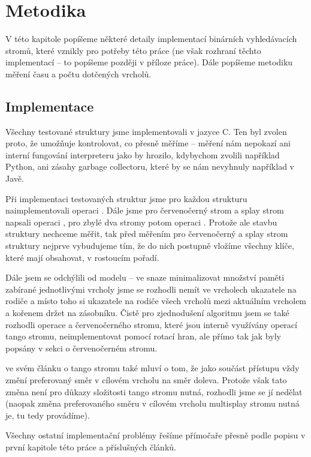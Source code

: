 \chapter{Metodika}

V této kapitole popíšeme některé detaily implementací binárních vyhledávacích stromů, které vznikly pro potřeby této práce (ne však rozhraní těchto implementací -- to popíšeme později v příloze práce). Dále popíšeme metodiku měření času a počtu dotčených vrcholů.

\section{Implementace}

Všechny testované struktury jsme implementovali v jazyce C. Ten byl zvolen proto, že umožňuje kontrolovat, co přesně měříme -- měření nám nepokazí ani interní fungování interpreteru jako by hrozilo, kdybychom zvolili například Python, ani zásahy garbage collectoru, které by se nám nevyhnuly například v Javě.

Při implementaci testovaných struktur jsme pro každou strukturu naimplementovali operaci . Dále jsme pro červenočerný strom a splay strom napsali operaci , pro zbylé dva stromy potom operaci . Protože ale stavbu struktury nechceme měřit, tak před měřením pro červenočerný a splay strom struktury nejprve vybudujeme tím, že do nich postupně vložíme všechny klíče, které mají obsahovat, v rostoucím pořadí. 

Dále jsem se odchýlili od modelu -- ve snaze minimalizovat množství paměti zabírané jednotlivými vrcholy jsme se rozhodli nemít ve vrcholech ukazatele na rodiče a místo toho si ukazatele na rodiče všech vrcholů mezi aktuálním vrcholem a kořenem držet na zásobníku. Čistě pro zjednodušení algoritmu jsem se také rozhodli operace  a  červenočerného stromu, které jsou interně využívány operací  tango stromu, neimplementovat pomocí rotací hran, ale přímo tak jak byly popsány v sekci o červenočerném stromu. 

\citet{tango} ve svém článku o tango stromu také mluví o tom, že jako součást přístupu vždy změní preferovaný směr v cílovém vrcholu na směr doleva. Protože však tato změna není pro důkazy složitosti tango stromu nutná, rozhodli jsme se jí nedělat (naopak změna preferovaného směru v cílovém vrcholu multisplay stromu nutná je, tu tedy provádíme).

Všechny ostatní implementační problémy řešíme přímočaře přesně podle popisu v první kapitole této práce a příslušných článků.

